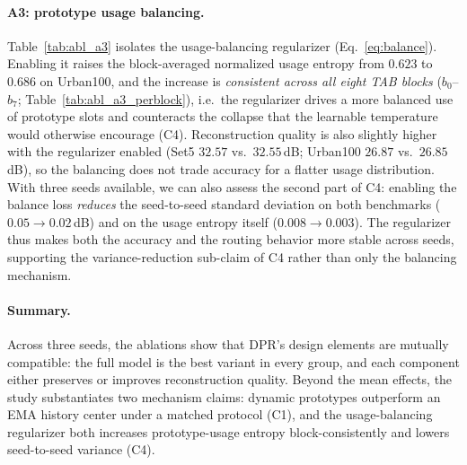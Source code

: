 \paragraph{A3: prototype usage balancing.}
Table~\ref{tab:abl_a3} isolates the usage-balancing regularizer
(Eq.~\eqref{eq:balance}). Enabling it raises the block-averaged normalized usage entropy
from $0.623$ to $0.686$ on Urban100, and the increase is \emph{consistent across all
eight TAB blocks} ($b_0$--$b_7$; Table~\ref{tab:abl_a3_perblock}), i.e.\ the regularizer
drives a more balanced use of prototype slots and counteracts the collapse that the
learnable temperature would otherwise encourage (C4). Reconstruction quality is also slightly
higher with the regularizer enabled (Set5 $32.57$ vs.\ $32.55$\,dB; Urban100 $26.87$ vs.\
  $26.85$\,dB), so the balancing does not trade accuracy for a flatter usage distribution.
  With three seeds available, we can also assess the second part of C4: enabling the
balance loss \emph{reduces} the seed-to-seed standard deviation on both benchmarks
($0.05\!\rightarrow\!0.02$\,dB) and on the usage entropy itself
($0.008\!\rightarrow\!0.003$). The regularizer thus makes both the accuracy and the routing
behavior more stable across seeds, supporting the variance-reduction sub-claim of C4 rather
than only the balancing mechanism.

\paragraph{Summary.}
Across three seeds, the ablations show that DPR's design elements are mutually
compatible: the full model is the best variant in every group, and each component
either preserves or improves reconstruction quality. Beyond the mean effects, the
study substantiates two mechanism claims: dynamic prototypes outperform an EMA history
center under a matched protocol (C1), and the usage-balancing regularizer both
increases prototype-usage entropy block-consistently and lowers seed-to-seed variance
(C4).
